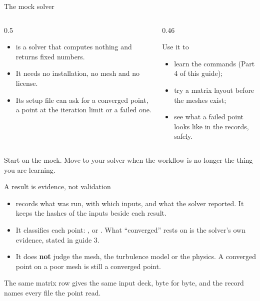 \begin{frame}{The mock solver}
\begin{columns}[T]
\begin{column}{0.5\textwidth}
\begin{itemize}
  \item {} is a solver that computes nothing and returns fixed
        numbers.
  \item It needs no installation, no mesh and no license.
  \item Its setup file can ask for a converged point, a point at the
        iteration limit or a failed one.
\end{itemize}
\end{column}
\begin{column}{0.46\textwidth}
\begin{block}{Use it to}
\begin{itemize}\small
  \item learn the commands (Part 4 of this guide);
  \item try a matrix layout before the meshes exist;
  \item see what a failed point looks like in the records, safely.
\end{itemize}
\end{block}
\end{column}
\end{columns}
\begin{takeaway}Start on the mock. Move to your solver when the workflow is
no longer the thing you are learning.\end{takeaway}
\end{frame}

\begin{frame}{A result is evidence, not validation}
\begin{itemize}
  \item \pkgname{} records what was run, with which inputs, and what the
        solver reported. It keeps the hashes of the inputs beside each
        result.
  \item It classifies each point: , 
        or . What ``converged'' rests on is the solver's own
        evidence, stated in guide 3.
  \item It does \textbf{not} judge the mesh, the turbulence model or the
        physics. A converged point on a poor mesh is still a converged
        point.
\end{itemize}
\begin{cfdbevidence}
The same matrix row gives the same input deck, byte for byte, and the record
names every file the point read.
\end{cfdbevidence}
\end{frame}

